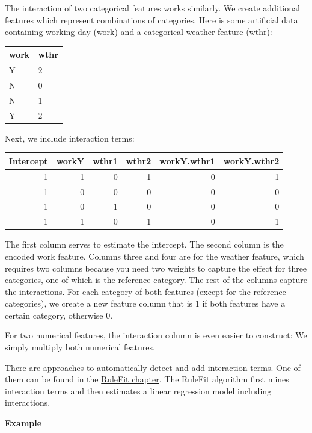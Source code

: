 \documentclass[
  11pt,
]{scrbook}
\begin{document}
The interaction of two categorical features works similarly.
We create additional features which represent combinations of categories.
Here is some artificial data containing working day (work) and a categorical weather feature (wthr):

\begin{table}
\centering
\begin{tabular}{ll}
\toprule
work & wthr\\
\midrule
Y & 2\\
N & 0\\
N & 1\\
Y & 2\\
\bottomrule
\end{tabular}
\end{table}

Next, we include interaction terms:

\begin{table}
\centering
\begin{tabular}{rrrrrr}
\toprule
Intercept & workY & wthr1 & wthr2 & workY.wthr1 & workY.wthr2\\
\midrule
1 & 1 & 0 & 1 & 0 & 1\\
1 & 0 & 0 & 0 & 0 & 0\\
1 & 0 & 1 & 0 & 0 & 0\\
1 & 1 & 0 & 1 & 0 & 1\\
\bottomrule
\end{tabular}
\end{table}

The first column serves to estimate the intercept.
The second column is the encoded work feature.
Columns three and four are for the weather feature, which requires two columns because you need two weights to capture the effect for three categories, one of which is the reference category.
The rest of the columns capture the interactions.
For each category of both features (except for the reference categories), we create a new feature column that is 1 if both features have a certain category, otherwise 0.

For two numerical features, the interaction column is even easier to construct:
We simply multiply both numerical features.

There are approaches to automatically detect and add interaction terms.
One of them can be found in the \protect\hyperlink{rulefit}{RuleFit chapter}.
The RuleFit algorithm first mines interaction terms and then estimates a linear regression model including interactions.

\textbf{Example}
\end{document}
